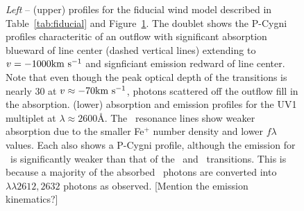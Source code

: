\documentclass[12pt,preprint]{aastex}
\begin{document}
\begin{figure}
\caption{
{\it Left} -- (upper)  profiles for the fiducial wind model
described in Table~\ref{tab:fiducial} and
Figure~\ref{fig:fiducial_nvt}.  The doublet shows the P-Cygni profiles
characteritic of an outflow with significant absorption blueward of
line center (dashed vertical lines) extending to $v = -1000{\rm km~s^{-1}}$
and signficiant emission redward of line center.  Note
that even though the peak optical depth of the  transitions
is nearly 30 at $v \approx -70 {\rm km~s^{-1}}$, photons scattered off the outflow
fill in the absorption.
(lower)  absorption and emission profiles for the UV1
multiplet at $\lambda \approx 2600$\AA.  The \feiid\ resonance lines 
show weaker absorption due to the smaller Fe$^+$ number density and
lower $f\lambda$ values.  Each also shows a P-Cygni profile, although
the emission for \feiia\ is significantly weaker than that of the
\feiib\ and \mgiid\ transitions.  This is because a majority of the
absorbed \feiia\ photons are converted into
~$\lambda\lambda 2612, 2632$ photons as observed.
[Mention the emission kinematics?]
}
\label{fig:fiducial_nvt}
\end{figure}
\end{document}

